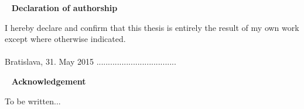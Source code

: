 \newpage
{~}\vfill
{\noindent \large\bf Declaration of authorship} 
\vspace{1.5cm}

I hereby declare and confirm that this thesis is entirely the result of my own work except
where otherwise indicated.\\\\ 
Bratislava, 31. May 2015
\hfill ................................... 
\vspace{1cm}

\newpage
{~}\vfill
{\noindent\large\bf Acknowledgement} 
\vspace{1.5cm}

To be written...  \\
\vspace{1cm}

\newpage


